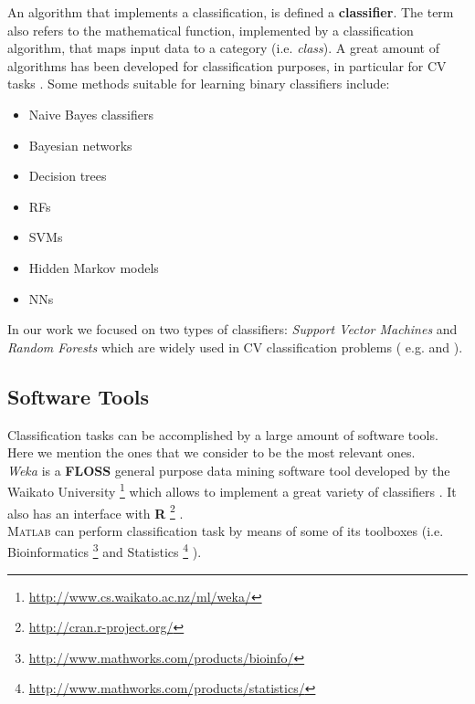 An algorithm that implements a classification, is defined a \textbf{classifier}.
The term also refers to the mathematical function, implemented by a classification algorithm, that maps input data to a category (i.e. \textit{class}).
A great amount of algorithms has been developed for classification purposes, in particular for \Gls{CV} tasks \cite{classificationSurvey}.
Some methods suitable for learning binary classifiers include\cite{dataMiningBook}:

\begin{itemize}
 \item Naive Bayes classifiers
 \item Bayesian networks \ \cite{bayesClassifiersCellSegmentation}
 \item Decision trees \ \cite{randTree01}
 \item \Glspl{RF} \ \cite{randForests01}
 \item \Glspl{SVM} \ \cite{SVM01}
 \item Hidden Markov models
 \item \Glspl{NN} \ \cite{russell2010artificial}
\end{itemize}


In our work we focused on two types of classifiers: \textit{Support Vector Machines} and \textit{Random Forests}
which are widely used in \Gls{CV} classification problems ( e.g. \cite{mitosisDetectionLearningBased} and \cite{randForests04}).

\subsection{Software Tools}

Classification tasks can be accomplished by a large amount of software tools. Here we mention the ones that we consider to be the most relevant ones.\\
\textit{Weka} \cite{dataMining_Weka, dataMining_Weka_upd} is a \textbf{FLOSS} general purpose data mining software tool developed by the Waikato University
\footnote{\url{http://www.cs.waikato.ac.nz/ml/weka/}} which allows to implement a great variety of classifiers \cite{dataMiningBook}. It also has an interface
with \textbf{R} \footnote{\url{http://cran.r-project.org/}} \cite{hornik2009open}.\\
{\scshape Matlab} can perform classification task by means of some of its toolboxes (i.e. Bioinformatics \footnote{\url{http://www.mathworks.com/products/bioinfo/} }
and Statistics \footnote{\url{http://www.mathworks.com/products/statistics/} } ).


\vspace{0.5cm}

